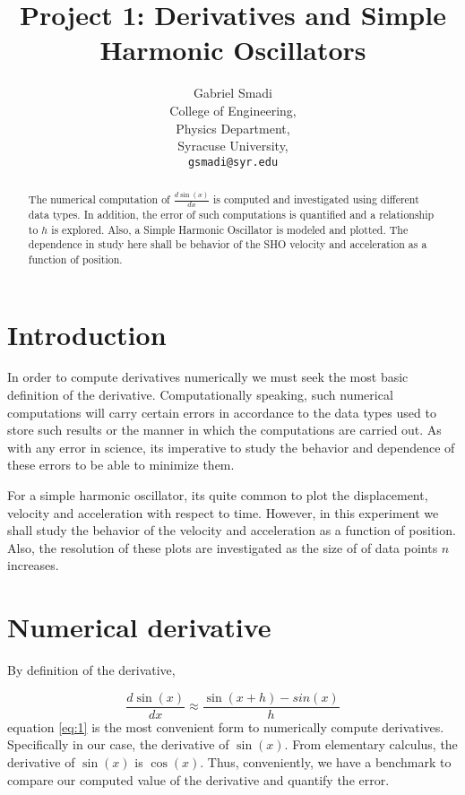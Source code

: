 \documentclass{article}
\begin{document}
\title{Project 1: Derivatives and Simple Harmonic Oscillators}

\author{Gabriel Smadi\\
  College of Engineering, \\
  Physics Department, \\
  Syracuse University,\\
  \texttt{gsmadi@syr.edu}}
\maketitle

\begin{abstract}
The numerical computation of \( \frac{d \sin(x)}{dx} \) is computed and investigated
using different data types. In addition, the error of such computations is quantified
and a relationship to $h$ is explored. Also, a Simple Harmonic
Oscillator is modeled and plotted. The dependence in study here shall be behavior of
the SHO velocity and acceleration as a function of position.
\end{abstract}

\section{Introduction}
In order to compute derivatives numerically we must seek the most basic definition of
the derivative. Computationally speaking, such numerical computations will carry certain
errors in accordance to the data types used to store such results or the manner in which
the computations are carried out. As with any error in science, its imperative to study
the behavior and dependence of these errors to be able to minimize them.

For a simple harmonic oscillator, its quite common to plot the displacement, velocity and
acceleration with respect to time. However, in this experiment we shall study the behavior
of the velocity and acceleration as a function of position. Also, the resolution of these plots
are investigated as the size of of data points $n$ increases.
\section{Numerical derivative}
By definition of the derivative,

\begin{equation} \label{eq:1}
\frac{d \sin(x)}{dx} \approx \frac{\sin(x+h) - sin(x)}{h}
\end{equation}
equation \ref{eq:1} is the most convenient form to numerically compute derivatives. Specifically in
our case, the derivative of $\sin(x)$. From elementary calculus, the derivative of $\sin(x)$ is $\cos(x)$.
Thus, conveniently, we have a benchmark to compare our computed value of the derivative and quantify the error.
\end{document}
